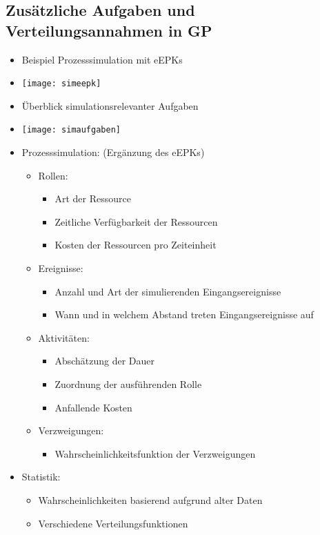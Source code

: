 \subsection{Zusätzliche Aufgaben und Verteilungsannahmen in GP}
\begin{itemize}
\item  Beispiel Prozesssimulation mit eEPKs
\item[] \texttt{[image: simeepk]} 
\item Überblick simulationsrelevanter Aufgaben
\item[] \texttt{[image: simaufgaben]} 
\item Prozesssimulation: (Ergänzung des eEPKs)
	\begin{itemize}
	\item Rollen:
		\begin{itemize}
		\item Art der Ressource 
		\item Zeitliche Verfügbarkeit der Ressourcen
		\item Kosten der Ressourcen pro Zeiteinheit
		\end{itemize}
	\item Ereignisse:
		\begin{itemize}
		\item Anzahl und Art der simulierenden Eingangsereignisse
		\item Wann und in welchem Abstand treten Eingangsereignisse auf
		\end{itemize}
	\item Aktivitäten:
		\begin{itemize}
		\item Abschätzung der Dauer
		\item Zuordnung der ausführenden Rolle
		\item Anfallende Kosten
		\end{itemize}
	\item Verzweigungen:
		\begin{itemize}
		\item Wahrscheinlichkeitsfunktion der Verzweigungen
		\end{itemize}
	\end{itemize}
	
\item Statistik:
	\begin{itemize}
	\item Wahrscheinlichkeiten basierend aufgrund alter Daten
	\item Verschiedene Verteilungsfunktionen
	\end{itemize}

\end{itemize}

